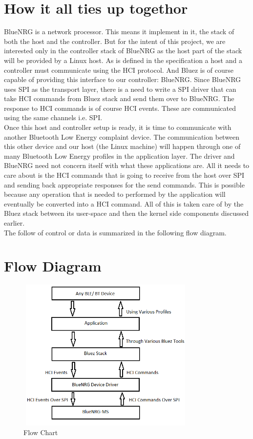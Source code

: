 \section{How it all ties up togethor}
BlueNRG is a network processor. This means it implement in it, the stack of both the host and the controller. But for the intent of this project, we are interested only in the controller stack of BlueNRG as the host part of the stack will be provided by a Linux host. As is defined in the specification a host and a controller must communicate using the HCI protocol. And Bluez is of course capable of providing this interface to our controller: BlueNRG. Since BlueNRG uses SPI as the transport layer, there is a need to write a SPI driver that can take HCI commands from Bluez stack and send them over to BlueNRG. The response to HCI commands is of course HCI events. These are communicated using the same channels i.e. SPI. \\
Once this host and controller setup is ready, it is time to communicate with another Bluetooth Low Energy complaint device. The communication between this other device and our host (the Linux machine) will happen through one of many Bluetooth Low Energy profiles in the application layer. The driver and BlueNRG need not concern itself with what these applications are. All it needs to care about is the HCI commands that is going to receive from the host over SPI and sending back appropriate responses for the send commands. This is possible because any operation that is needed to performed by the application will eventually be converted into a HCI command. All of this is taken care of by the Bluez stack between its user-space and then the kernel side components discussed earlier. \\
The follow of control or data is summarized in the following flow diagram.
\section{Flow Diagram}
\begin{figure}[ht]
	\centering
	\includegraphics[width=3.5in, height=3in]{images/flow_chart.png}
	\caption{Flow Chart}
\end{figure}
